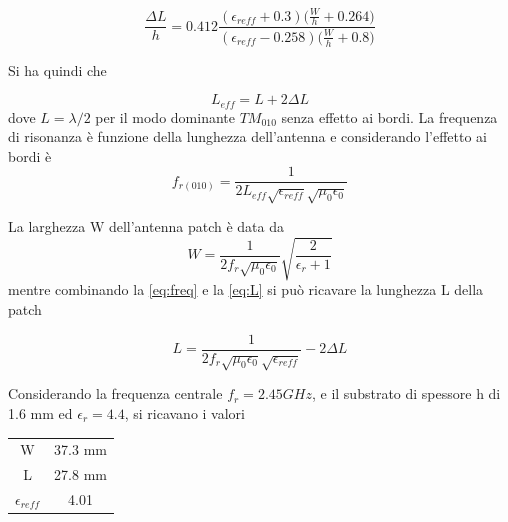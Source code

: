 \documentclass[twoside,twocolumn]{article}
\begin{document}
\begin{equation}
\frac{\Delta L}{h}= 0.412\frac{(\epsilon_{reff}+0.3)\Big(\frac{W}{h}+0.264\Big)}{(\epsilon_{reff}-0.258)\Big(\frac{W}{h}+0.8\Big)}
\end{equation}

Si ha quindi che

\begin{equation}\label{eq:L}
L_{eff}=L+2\Delta L
\end{equation}
dove $L=\lambda/2$ per il modo dominante $TM_{010}$ senza effetto ai bordi.
La frequenza di risonanza è funzione della lunghezza dell'antenna e considerando l'effetto ai bordi è 
\begin{equation} \label{eq:freq}
f_{r(010)}=\frac{1}{2L_{eff}\sqrt{\epsilon_{reff}}\sqrt{\mu_{0}\epsilon_{0}}}
\end{equation}

La larghezza W dell'antenna patch è data da 
\begin{equation}
W=\frac{1}{2f_{r}\sqrt{\mu_{0}\epsilon_{0}}}\sqrt{\frac{2}{\epsilon_{r}+1}}
\end{equation}
mentre combinando la \eqref{eq:freq} e la \eqref{eq:L} si può ricavare la lunghezza L della patch

\begin{equation}
L=\frac{1}{2f_{r}\sqrt{\mu_{0}\epsilon_{0}}\sqrt{\epsilon_{reff}}}-2\Delta L
\end{equation}

Considerando la frequenza centrale $f_{r}= 2.45GHz$, e il  
substrato di spessore h di 1.6 mm ed $\epsilon_{r}=4.4$,
si ricavano i valori

\begin{center}
\begin{tabular}{ |c|c| } 
 \hline
 W & 37.3 mm \\ 
 L & 27.8 mm \\ 
 $\epsilon_{reff}$ & 4.01 \\
 \hline
\end{tabular}
\end{center}
\end{document}

